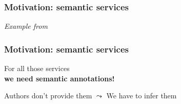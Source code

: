 \documentclass[aspectratio=169]{beamer}
\def\examplecite#1{{\textit{\color{black!60!blue}\small Example from \cite{#1}}}}
\begin{document}
\begin{frame}
    \frametitle{Motivation: semantic services}
    \hfill \examplecite{krisciunas2022including}\par
    \centering
\end{frame}


\begin{frame}
    \frametitle{Motivation: semantic services}
    \centering
    \Large
    For all those services\\
    {\bfseries we need semantic annotations!}
    \vspace{2em}\par
    \pause
    Authors don't provide them $\leadsto$ We have to infer them
\end{frame}
\end{document}
